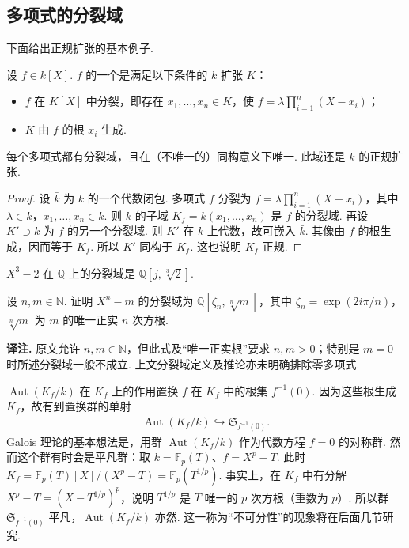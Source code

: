 \subsection{多项式的分裂域}\label{sec:galois-2-3-5}
下面给出正规扩张的基本例子.
\begin{definition*}
设 $f\in k[X]$. $f$ 的一个是满足以下条件的 $k$ 扩张 $K$：
\begin{itemize}
\item $f$ 在 $K[X]$ 中分裂，即存在 $x_1,\ldots,x_n\in K$，使 $f=\lambda\prod_{i=1}^n(X-x_i)$；
\item $K$ 由 $f$ 的根 $x_i$ 生成.
\end{itemize}
\end{definition*}
\begin{corollary*}
每个多项式都有分裂域，且在（不唯一的）同构意义下唯一. 此域还是 $k$ 的正规扩张.
\end{corollary*}
\begin{proof}
设 $\bar k$ 为 $k$ 的一个代数闭包. 多项式 $f$ 分裂为 $f=\lambda\prod_{i=1}^n(X-x_i)$，其中 $\lambda\in k$，$x_1,\ldots,x_n\in\bar k$. 则 $\bar k$ 的子域 $K_f=k(x_1,\ldots,x_n)$ 是 $f$ 的分裂域. 再设 $K'\supset k$ 为 $f$ 的另一个分裂域. 则 $K'$ 在 $k$ 上代数，故可嵌入 $\bar k$. 其像由 $f$ 的根生成，因而等于 $K_f$. 所以 $K'$ 同构于 $K_f$. 这也说明 $K_f$ 正规.
\end{proof}
\begin{example*}
$X^3-2$ 在 $\mathbb Q$ 上的分裂域是 $\mathbb Q[j,\sqrt[3]{2}]$.
\end{example*}
\begin{exercise*}
设 $n,m\in\mathbb N$. 证明 $X^n-m$ 的分裂域为 $\mathbb Q[\zeta_n,\sqrt[n]{m}]$，其中 $\zeta_n=\exp(2i\pi/n)$，$\sqrt[n]{m}$ 为 $m$ 的唯一正实 $n$ 次方根.
\end{exercise*}
\noindent\textbf{译注.} 原文允许 $n,m\in\mathbb N$，但此式及``唯一正实根''要求 $n,m>0$；特别是 $m=0$ 时所述分裂域一般不成立. 上文分裂域定义及推论亦未明确排除零多项式.
\begin{remark*}
$\operatorname{Aut}(K_f/k)$ 在 $K_f$ 上的作用置换 $f$ 在 $K_f$ 中的根集 $f^{-1}(0)$. 因为这些根生成 $K_f$，故有到置换群的单射
\begin{align*}
\operatorname{Aut}(K_f/k)\hookrightarrow\mathfrak S_{f^{-1}(0)}.
\end{align*}
Galois 理论的基本想法是，用群 $\operatorname{Aut}(K_f/k)$ 作为代数方程 $f=0$ 的对称群. 然而这个群有时会是平凡群：取 $k=\mathbb F_p(T)$、$f=X^p-T$. 此时 $K_f=\mathbb F_p(T)[X]/(X^p-T)=\mathbb F_p(T^{1/p})$. 事实上，在 $K_f$ 中有分解 $X^p-T=(X-T^{1/p})^p$，说明 $T^{1/p}$ 是 $T$ 唯一的 $p$ 次方根（重数为 $p$）. 所以群 $\mathfrak S_{f^{-1}(0)}$ 平凡，$\operatorname{Aut}(K_f/k)$ 亦然. 这一称为``不可分性''的现象将在后面几节研究.
\end{remark*}



